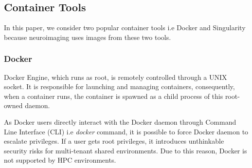 \documentclass[a4paper,num-refs]{oup-contemporary}
\begin{document}
\subsection{Container Tools}


In this paper, we consider two popular container tools i.e Docker and Singularity because
neuroimaging uses images from these two tools.

\subsubsection{Docker}


%
%
%
Docker Engine, which runs as root, is remotely controlled through a
UNIX socket. It is responsible for launching and managing containers,
consequently, when a container runs, the container is spawned as a
child process of this root-owned daemon.

As Docker users directly interact with the
Docker daemon through Command Line Interface (CLI) i.e \textit{docker} command, it is possible to force Docker daemon to escalate privileges.
If a user gets root privileges, it
introduces unthinkable security risks for multi-tenant shared
environments. Due to this reason, Docker is not supported by
HPC environments.
\end{document}
